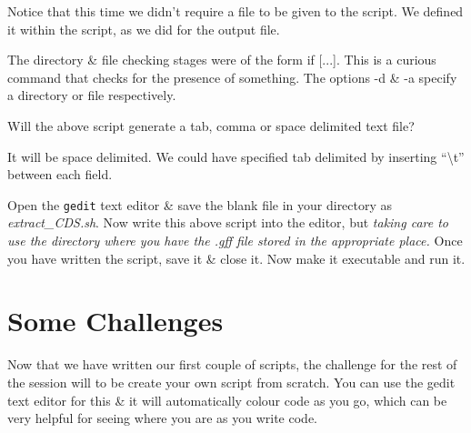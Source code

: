 \documentclass[a4paper,12pt,twoside]{memoir}
\begin{document}
Notice that this time we didn't require a file to be given to the script.
We defined it within the script, as we did for the output file.

\begin{information}
The directory \& file checking stages were of the form if [...].
This is a curious command that checks for the presence of something. 
The options -d \& -a specify a directory or file respectively.
\end{information}

\begin{questions}
Will the above script generate a tab, comma or space delimited text file? \\
\begin{answer}
It will be space delimited. 
We could have specified tab delimited by inserting ``\textbackslash t'' between each field.
\end{answer}
\end{questions}

\begin{steps}
Open the \texttt{gedit} text editor \& save the blank file in your directory as \textit{extract_CDS.sh}.
Now write this above script into the editor, but \textit{taking care to use the directory where you have the .gff file stored in the appropriate place.}
Once you have written the script, save it \& close it.
Now make it executable and run it.\\
\end{steps}


\section{Some Challenges}
Now that we have written our first couple of scripts, the challenge for the rest of the session will to be create your own script from scratch.
You can use the gedit text editor for this \& it will automatically colour code as you go, which can be very helpful for seeing where you are as you write code.
\end{document}
